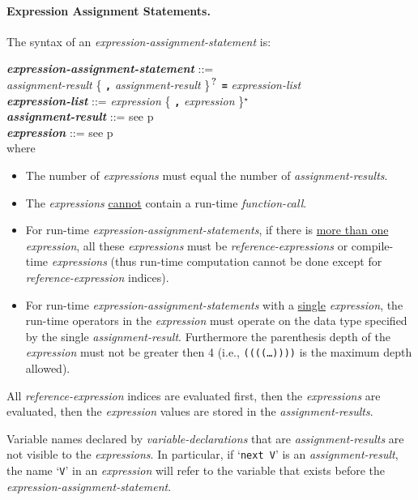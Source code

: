 \documentclass[12pt]{article}
\newcommand{\subsubsubsection}[1]{\paragraph[#1]{#1.}}
\newcommand{\TT}[1]{{\tt \bfseries #1}}
\newcommand{\STAR}{{\Large $^\star$}}
\newcommand{\QMARK}{{$^{\,\mbox{\footnotesize ?}}$}}
\newcommand{\emkey}[1]{{\em \bfseries #1}}
\newcommand{\pagref}[1]{p\pageref{#1}}
\newenvironment{indpar}[1][0.3in]%
	{\begin{list}{}%
		     {\setlength{\itemsep}{0in}%
		      \setlength{\topsep}{0in}%
		      \setlength{\parsep}{1ex}%
		      \setlength{\labelwidth}{#1}%
		      \setlength{\leftmargin}{#1}%
		      \addtolength{\leftmargin}{\labelsep}}%
	 \item}%
	{\end{list}}
\begin{document}
\subsubsubsection{Expression Assignment Statements}
\label{EXPRESSION-ASSIGNMENT-STATEMENTS}

The syntax of an {\em expression-assign\-ment-statement} is:
\begin{indpar}
\emkey{expression-assignment-statement} ::= \\
\hspace*{0.5in} {\em assignment-result}
                \{ \TT{,} {\em assignment-result} \}\QMARK{}
		\TT{=} {\em expression-list}
\\[0.5ex]
\emkey{expression-list}\label{EXPRESSION-LIST} ::=
	      {\em expression} \{ \TT{,} {\em expression} \}\STAR{}
\\[0.5ex]
\emkey{assignment-result} ::= see \pagref{ASSIGNMENT-RESULT}
\\[0.5ex]
\emkey{expression} ::= see \pagref{EXPRESSION}
\\[2.0ex]
where
\begin{itemize}

\item The number of {\em expressions} must equal the number
of {\em assignment-results}.

\item The
{\em expressions} \underline{cannot} contain a run-time {\em function-call}.

\item For run-time {\em expression-assignment-statements}, if
there is \underline{more than one} {\em expression}, all these
{\em expressions} must be {\em reference-expressions} or
compile-time {\em expressions} (thus run-time computation cannot
be done except for {\em reference-expression} indices).

\item For run-time {\em expression-assignment-statements} with
a \underline{single} {\em expression}, the run-time operators
in the {\em expression} must operate on
the data type specified by the single {\em assignment-result}.
Furthermore the parenthesis depth of the {\em expression}
must not be greater then 4 (i.e., {\tt ((((\ldots))))} is the
maximum depth allowed).

\end{itemize}
\end{indpar}

All {\em reference-expression} indices are evaluated first,
then the {\em expressions} are evaluated,
then the {\em expression} values are stored in the {\em assignment-results}.

Variable names declared by {\em variable-declarations} that are
{\em assignment-results} are not visible to the {\em expressions}.
In particular, if `{\tt next V}' is an {\em assignment-result},
the name `{\tt V}' in an {\em expression} will refer to the variable
that exists before the {\em expression-assignment-statement}.
\end{document}
